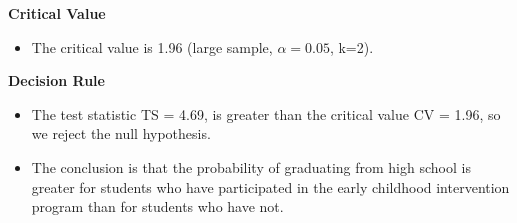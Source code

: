 \documentclass[a4paper,12pt]{article}
\begin{document}
\textbf{Critical Value}
\begin{itemize}
\item The critical value is 1.96 (large sample, $\alpha = 0.05$, k=2).
\end{itemize}


\textbf{Decision Rule}
\begin{itemize} 
\item The test statistic TS = 4.69, is greater than the critical value CV = 1.96, so we reject the null hypothesis.
\item The conclusion is that the probability of graduating from high school is greater for students who have participated in the early childhood intervention program than for students who have not.
\end{itemize}
\end{document}
